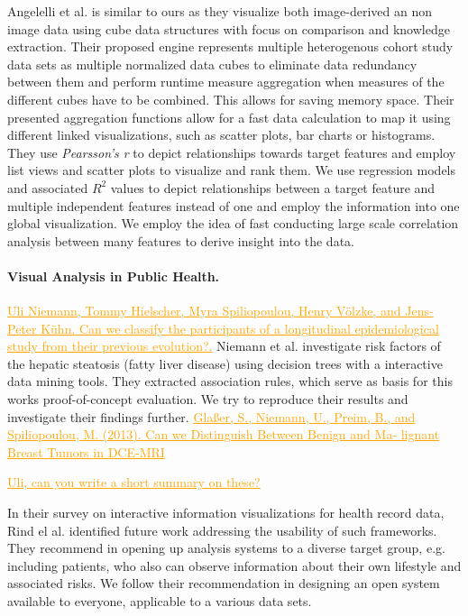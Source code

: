 \documentclass[journal]{style/vgtc} 			          %
\newcommand{\com}[1]{\textcolor{orange}{\uline{#1}}}
\begin{document}
Angelelli et al. \cite{Angelelli} is similar to ours as they visualize both image-derived an non image data using cube data structures with focus on comparison and knowledge extraction.
Their proposed engine represents multiple heterogenous cohort study data sets as multiple normalized data cubes to eliminate data redundancy between them and perform runtime measure aggregation when measures of the different cubes have to be combined.
This allows for saving memory space.
Their presented aggregation functions allow for a fast data calculation to map it using different linked visualizations, such as scatter plots, bar charts or histograms.
They use \emph{Pearsson's r} to depict relationships towards target features and employ list views and scatter plots to visualize and rank them.
We use regression models and associated $R^2$ values to depict relationships between a target feature and multiple independent features instead of one and employ the information into one global visualization.
We employ the idea of fast conducting large scale correlation analysis between many features to derive insight into the data.

\paragraph{Visual Analysis in Public Health.}
\com{Uli Niemann, Tommy Hielscher, Myra Spiliopoulou, Henry Völzke, and Jens-Peter Kühn. Can we classify the participants of a longitudinal epidemiological study from their previous evolution?.}
Niemann et al. \cite{Niemann2014} investigate risk factors of the hepatic steatosis (fatty liver disease) using decision trees with a interactive data mining tools.
They extracted association rules, which serve as basis for this works proof-of-concept evaluation.
We try to reproduce their results and investigate their findings further.
\com{Glaßer, S., Niemann, U., Preim, B., and Spiliopoulou, M. (2013). Can we Distinguish Between Benign and Ma- lignant Breast Tumors in DCE-MRI}

\com{Uli, can you write a short summary on these?}

In their survey on interactive information visualizations for health record data, Rind el al. \cite{Rind} identified future work addressing the usability of such frameworks.
They recommend in opening up analysis systems to a diverse target group, e.g. including patients, who also can observe information about their own lifestyle and associated risks.
We follow their recommendation in designing an open system available to everyone, applicable to a various data sets.
\end{document}
